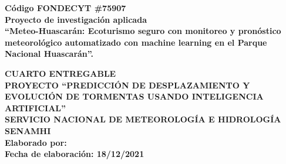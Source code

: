 \begin{titlepage}
	
	\begin{center}
		\vspace*{2 mm}
		{\small \textbf{Código FONDECYT \#75907}}\\
		\vspace{2 cm}
		{\large \textbf{Proyecto de investigación aplicada}}\\
		\vspace{5 mm}
		{\large \textbf{``Meteo-Huascarán: Ecoturismo seguro con monitoreo y 
    pronóstico meteorológico automatizado con machine learning en el Parque 
    Nacional Huascarán”.}}\\
		\vspace{3 cm}

		\doublespacing  
		{\LARGE \textbf{CUARTO ENTREGABLE} }\\

		{\LARGE \textbf{PROYECTO ``PREDICCIÓN DE DESPLAZAMIENTO Y EVOLUCIÓN DE 
    TORMENTAS USANDO INTELIGENCIA ARTIFICIAL”} }\\
		
		
		\vspace{3 cm}	
		{\LARGE \textbf{SERVICIO NACIONAL DE METEOROLOGÍA E HIDROLOGÍA} }\\
		{\LARGE \textbf{SENAMHI} }\\
		\vspace{2 cm}
		{\large \textbf{Elaborado por: \@author} }\\
		\vspace{5 mm}	
		{\large \textbf{Fecha de elaboración: 18/12/2021} }\\

	\end{center}

\end{titlepage}